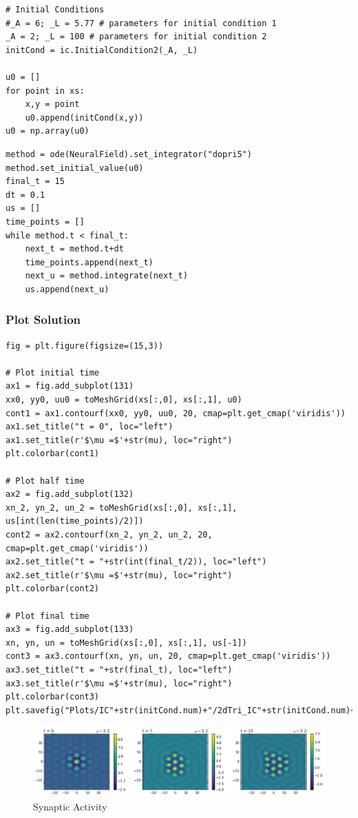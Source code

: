 \documentclass{uonmathreport}
\begin{document}
\begin{verbatim}
# Initial Conditions
#_A = 6; _L = 5.77 # parameters for initial condition 1
_A = 2; _L = 100 # parameters for initial condition 2
initCond = ic.InitialCondition2(_A, _L)

u0 = []
for point in xs:
	x,y = point
	u0.append(initCond(x,y))
u0 = np.array(u0)
\end{verbatim}

\begin{verbatim}
method = ode(NeuralField).set_integrator("dopri5")
method.set_initial_value(u0)
final_t = 15
dt = 0.1
us = []
time_points = []
while method.t < final_t:
	next_t = method.t+dt
	time_points.append(next_t)
	next_u = method.integrate(next_t)
	us.append(next_u)
\end{verbatim}

\subsubsection{Plot Solution}\label{plot-solution}

\begin{verbatim}
fig = plt.figure(figsize=(15,3))

# Plot initial time
ax1 = fig.add_subplot(131)
xx0, yy0, uu0 = toMeshGrid(xs[:,0], xs[:,1], u0)
cont1 = ax1.contourf(xx0, yy0, uu0, 20, cmap=plt.get_cmap('viridis'))
ax1.set_title("t = 0", loc="left")
ax1.set_title(r'$\mu =$'+str(mu), loc="right")
plt.colorbar(cont1)

# Plot half time
ax2 = fig.add_subplot(132)
xn_2, yn_2, un_2 = toMeshGrid(xs[:,0], xs[:,1], us[int(len(time_points)/2)])
cont2 = ax2.contourf(xn_2, yn_2, un_2, 20, cmap=plt.get_cmap('viridis'))
ax2.set_title("t = "+str(int(final_t/2)), loc="left")
ax2.set_title(r'$\mu =$'+str(mu), loc="right")
plt.colorbar(cont2)

# Plot final time
ax3 = fig.add_subplot(133)
xn, yn, un = toMeshGrid(xs[:,0], xs[:,1], us[-1])
cont3 = ax3.contourf(xn, yn, un, 20, cmap=plt.get_cmap('viridis'))
ax3.set_title("t = "+str(final_t), loc="left")
ax3.set_title(r'$\mu =$'+str(mu), loc="right")
plt.colorbar(cont3)
plt.savefig("Plots/IC"+str(initCond.num)+"/2dTri_IC"+str(initCond.num)+str(NT)+"_elems_("+str(mu)+")mu.png")
\end{verbatim}

\begin{figure}[H]
	\centering
	\includegraphics[width=1\textwidth]{2dNystTriang_Main_files/2dNystTriang_Main_16_0.png}
	\caption{Synaptic Activity}
\end{figure}
\end{document}
